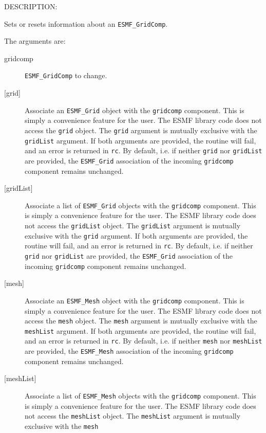 {\sf DESCRIPTION:\\ }


   Sets or resets information about an {\tt ESMF\_GridComp}.
  
   The arguments are:
   \begin{description}
   \item[gridcomp]
     {\tt ESMF\_GridComp} to change.
   \item[{[grid]}]
     Associate an {\tt ESMF\_Grid} object with the {\tt gridcomp} component.
     This is simply a convenience feature for the user. The ESMF library code
     does not access the {\tt grid} object.
     The {\tt grid} argument is mutually exclusive with the {\tt gridList}
     argument. If both arguments are provided, the routine will fail, and an
     error is returned in {\tt rc}.
     By default, i.e. if neither {\tt grid} nor {\tt gridList} are provided,
     the {\tt ESMF\_Grid} association of the incoming {\tt gridcomp}
     component remains unchanged.
   \item[{[gridList]}]
     Associate a list of {\tt ESMF\_Grid} objects with the {\tt gridcomp}
     component.
     This is simply a convenience feature for the user. The ESMF library code
     does not access the {\tt gridList} object.
     The {\tt gridList} argument is mutually exclusive with the {\tt grid}
     argument. If both arguments are provided, the routine will fail, and an
     error is returned in {\tt rc}.
     By default, i.e. if neither {\tt grid} nor {\tt gridList} are provided,
     the {\tt ESMF\_Grid} association of the incoming {\tt gridcomp}
     component remains unchanged.
   \item[{[mesh]}]
     Associate an {\tt ESMF\_Mesh} object with the {\tt gridcomp} component.
     This is simply a convenience feature for the user. The ESMF library code
     does not access the {\tt mesh} object.
     The {\tt mesh} argument is mutually exclusive with the {\tt meshList}
     argument. If both arguments are provided, the routine will fail, and an
     error is returned in {\tt rc}.
     By default, i.e. if neither {\tt mesh} nor {\tt meshList} are provided,
     the {\tt ESMF\_Mesh} association of the incoming {\tt gridcomp}
     component remains unchanged.
   \item[{[meshList]}]
     Associate a list of {\tt ESMF\_Mesh} objects with the {\tt gridcomp}
     component.
     This is simply a convenience feature for the user. The ESMF library code
     does not access the {\tt meshList} object.
     The {\tt meshList} argument is mutually exclusive with the {\tt mesh}

\end{description}
